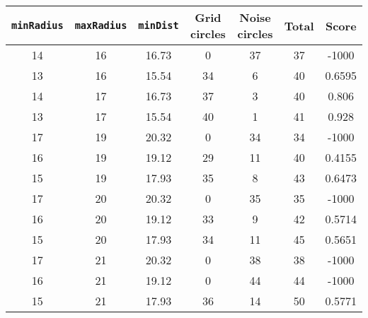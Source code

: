 \documentclass[letterpaper, 12pt]{article}
\begin{document}
\begin{longtable}{|c|c|c|c|c|c|c|}
\hline
\textbf{\texttt{minRadius}} & \textbf{\texttt{maxRadius}} & \textbf{\texttt{minDist}} & \textbf{Grid circles} & \textbf{Noise circles} & \textbf{Total} & \textbf{Score} \\
\hline
14 & 16 & 16.73 & 0 & 37 & 37 & -1000 \\
\hline
13 & 16 & 15.54 & 34 & 6 & 40 & 0.6595 \\
\hline
14 & 17 & 16.73 & 37 & 3 & 40 & 0.806 \\
\hline
13 & 17 & 15.54 & 40 & 1 & 41 & 0.928 \\
\hline
17 & 19 & 20.32 & 0 & 34 & 34 & -1000 \\
\hline
16 & 19 & 19.12 & 29 & 11 & 40 & 0.4155 \\
\hline
15 & 19 & 17.93 & 35 & 8 & 43 & 0.6473 \\
\hline
17 & 20 & 20.32 & 0 & 35 & 35 & -1000 \\
\hline
16 & 20 & 19.12 & 33 & 9 & 42 & 0.5714 \\
\hline
15 & 20 & 17.93 & 34 & 11 & 45 & 0.5651 \\
\hline
17 & 21 & 20.32 & 0 & 38 & 38 & -1000 \\
\hline
16 & 21 & 19.12 & 0 & 44 & 44 & -1000 \\
\hline
15 & 21 & 17.93 & 36 & 14 & 50 & 0.5771 \\
\hline
\end{longtable}
\end{document}
